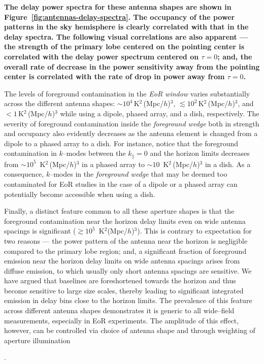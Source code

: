 \documentclass[preprint2,iop,numberedappendix]{emulateapj}
\begin{document}
{\bf The delay power spectra for these antenna shapes are shown in Figure~\ref{fig:antennas-delay-spectra}. The occupancy of the power patterns in the sky hemisphere is clearly correlated with that in the delay spectra. The following visual correlations are also apparent --- the strength of the primary lobe centered on the pointing center is correlated with the delay power spectrum centered on $\tau=0$; and, the overall rate of decrease in the power sensitivity away from the pointing center is correlated with the rate of drop in power away from $\tau=0$. 

The levels of foreground contamination in the {\it EoR window} varies substantially across the different antenna shapes: $\sim 10^4\,$K$^2\,$(Mpc/$h$)$^3$, $\lesssim 10^2\,$K$^2\,$(Mpc/$h$)$^3$, and $<1\,$K$^2\,$(Mpc/$h$)$^3$ while using a dipole, phased array, and a dish, respectively. The severity of foreground contamination inside the {\it foreground wedge} both in strength and occupancy also evidently decreases as the antenna element is changed from a dipole to a phased array to a dish. For instance, notice that the foreground contamination in $k$--modes between the $k_\parallel=0$ and the horizon limits decreases from $\sim 10^5$~K$^2\,$(Mpc/$h$)$^3$ in a phased array to $\sim 10$~K$^2\,$(Mpc/$h$)$^3$ in a dish. As a consequence, $k$--modes in the {\it foreground wedge} that may be deemed too contaminated for EoR studies in the case of a dipole or a phased array can potentially become accessible when using a dish.

Finally, a distinct feature common to all these aperture shapes is that the foreground contamination near the horizon delay limits even on wide antenna spacings is significant ($\gtrsim 10^5$~K$^2$(Mpc/$h$)$^3$). This is contrary to expectation for two reasons --- the power pattern of the antenna near the horizon is negligible compared to the primary lobe region; and, a significant fraction of foreground emission near the horizon delay limits on wide antenna spacings arises from diffuse emission, to which usually only short antenna spacings are sensitive. We have argued that baselines are foreshortened towards the horizon and thus become sensitive to large size scales, thereby leading to significant integrated emission in delay bins close to the horizon limits. The prevalence of this feature across different antenna shapes demonstrates it is generic to all wide--field measurements, especially in EoR experiments. The amplitude of this effect, however, can be controlled via choice of antenna shape and through weighting of aperture illumination}.
\end{document}
